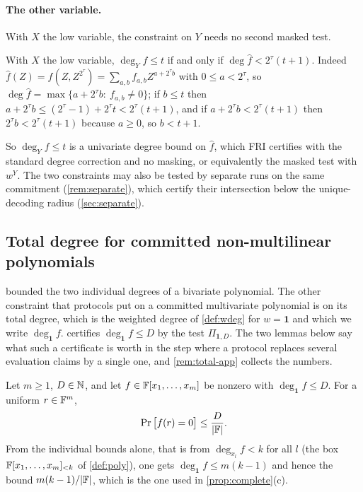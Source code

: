 \paragraph{The other variable.} With $X$ the low variable, the constraint on $Y$ needs no second
masked test.

\begin{remark}\label{rem:avss-y}
With $X$ the low variable, $\deg_Yf\le t$ if and only if $\deg\hat f<2^\tau(t+1)$. Indeed
$\hat f(Z)=f(Z,Z^{2^\tau})=\sum_{a,b}f_{a,b}Z^{a+2^\tau b}$ with $0\le a<2^\tau$, so
$\deg\hat f=\max\{a+2^\tau b:\ f_{a,b}\ne0\}$; if $b\le t$ then
$a+2^\tau b\le(2^\tau-1)+2^\tau t<2^\tau(t+1)$, and if $a+2^\tau b<2^\tau(t+1)$ then
$2^\tau b<2^\tau(t+1)$ because $a\ge0$, so $b<t+1$.
\end{remark}

So $\deg_Yf\le t$ is a univariate degree bound on $\hat f$, which FRI certifies with the
standard degree correction and no masking, or equivalently the masked test with $w^Y$. The two
constraints may also be tested by separate runs on the same commitment (\cref{rem:separate}),
which certify their intersection below the unique-decoding radius (\cref{sec:separate}).

\subsection{Total degree for committed non-multilinear polynomials}\label{sec:total}

 bounded the two individual degrees of a bivariate polynomial. The other constraint
that protocols put on a committed multivariate polynomial is on its total degree, which is the
weighted degree of \cref{def:wdeg} for $w=\mathbf 1$ and which we write $\deg_{\mathbf 1}f$.
 certifies $\deg_{\mathbf 1}f\le D$ by the test $\Pi_{\mathbf 1,D}$. The two lemmas
below say what such a certificate is worth in the step where a protocol replaces several evaluation
claims by a single one, and \cref{rem:total-app} collects the numbers.

\begin{lemma}\label{lem:sz-total}
Let $m\ge1$, $D\in\mathbb{N}$, and let $f\in\mathbb{F}[x_1,\dots,x_m]$ be nonzero with $\deg_{\mathbf 1}f\le D$. For
a uniform $r\in\mathbb{F}^m$,
\[
\Pr\big[f(r)=0\big]\le\frac{D}{|\mathbb{F}|}.
\]
From the individual bounds alone, that is from $\deg_{x_l}f<k$ for all $l$ (the box
$\mathbb{F}[x_1,\dots,x_m]_{<k}$ of \cref{def:poly}), one gets $\deg_{\mathbf 1}f\le m(k-1)$ and hence the
bound $m(k-1)/|\mathbb{F}|$, which is the one used in \cref{prop:complete}(c).
\end{lemma}

